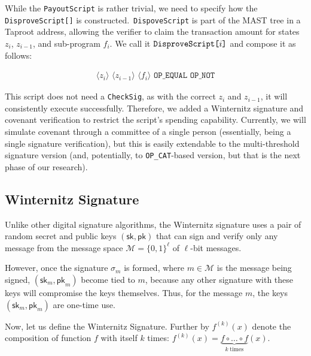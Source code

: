 \documentclass{iacrtrans}
\newcommand{\elem}[1]{\, \langle #1 \rangle \,}
\newcommand{\opcode}[1]{\, \texttt{#1} \,}
\begin{document}
While the \texttt{PayoutScript} is rather trivial, we need to specify how the
\texttt{DisproveScript[]} is constructed.\ \texttt{DispoveScript} is
part of the MAST tree in a Taproot address, allowing the verifier to claim the
transaction amount for states \(z_i\), \(z_{i-1}\), and sub-program \(f_i\). We
call it \(\texttt{DisproveScript[\text{$i$}]}\) and compose it as follows:

\begin{empheqboxed}
  \begin{align*}
    \elem{z_i} \elem{z_{i-1}} \elem{f_i} \opcode{OP\_EQUAL} \opcode{OP\_NOT}
  \end{align*}
\end{empheqboxed}

This script does not need a \texttt{CheckSig}, as with the correct \(z_i\) and
\(z_{i-1}\), it will consistently execute successfully. Therefore, we added a
Winternitz signature and covenant verification to restrict the script's spending
capability. Currently, we will simulate covenant through a committee of a single
person (essentially, being a single signature verification), but this is easily
extendable to the multi-threshold signature version (and, potentially, to
\texttt{OP\_CAT}-based version, but that is the next phase of our research).

\subsection{Winternitz Signature}\label{sec:lamport-signature}

Unlike other digital signature algorithms, the Winternitz signature uses a pair
of random secret and public keys $(\mathsf{sk}, \mathsf{pk})$ that can sign and
verify only any message from the message space \(\mathcal{M} = {\{0,
1\}}^{\ell}\) of $\ell$-bit messages.

However, once the signature $\sigma_{m}$ is formed, where $m \in \mathcal{M}$ is
the message being signed, \((\mathsf{sk}_{m}, \mathsf{pk}_{m})\) become tied to
\(m\), because any other signature with these keys will compromise the keys
themselves. Thus, for the message \(m\), the keys \((\mathsf{sk}_{m},
\mathsf{pk}_{m})\) are one-time use.

Now, let us define the Winternitz Signature. Further by $f^{(k)}(x)$ denote the
composition of function $f$ with itself $k$ times: $f^{(k)}(x) = \underbrace{f
\circ \dots \circ f}_{k \; \text{times}}(x)$.
\end{document}
